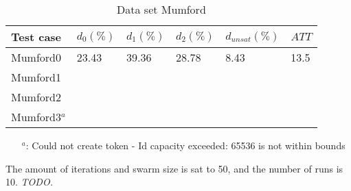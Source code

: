\begin{table}[H]
    \centering
    \hspace*{-1.0cm}
    \begin{tabular}{|l|l|l|l|l|l|}
        \hline
        Test case &  $d_0(\%)$ & $d_1(\%)$ & $d_2(\%)$ & $d_{unsat}(\%)$ & $ATT$\\
        \hline
        Mumford0 & 23.43 & 39.36 & 28.78 & 8.43 & 13.5\\
        Mumford1 & &  & & &\\
        Mumford2 & &  & & &\\
        Mumford3$^a$  & & & &&\\
        \hline
    \end{tabular}
    \caption{Data set Mumford}
    \begin{itemize}[noitemsep]
    \item[$^a$:] Could not create token - Id capacity exceeded: 65536 is not within bounds
    \end{itemize}
    \label{table:dataSet_mumford}
\end{table}
The amount of iterations and swarm size is sat to 50, and the number of runs is 10. \emph{\color{blue} TODO.}